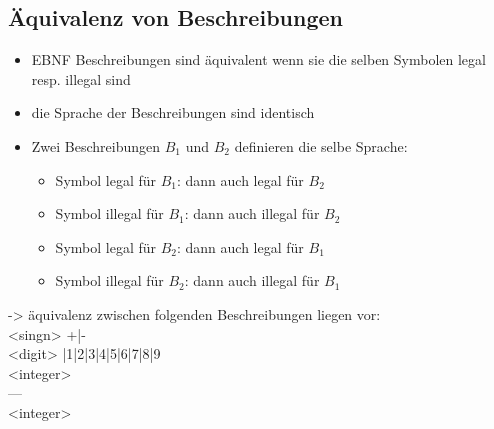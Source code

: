 \documentclass[11pt]{article}
\begin{document}
\subsection{Äquivalenz von Beschreibungen}
\label{sec:org9151ca3}
\begin{itemize}
\item EBNF Beschreibungen sind äquivalent wenn sie die selben Symbolen legal resp. illegal sind\\
\item die Sprache der Beschreibungen sind identisch\\
\item Zwei Beschreibungen \(B_1\) und \(B_2\) definieren die selbe Sprache:\\
\begin{itemize}
\item Symbol legal für \(B_1\): dann auch legal für \(B_2\)\\
\item Symbol illegal für \(B_1\): dann auch illegal für \(B_2\) \\
\item Symbol legal für \(B_2\): dann auch legal für \(B_1\)\\
\item Symbol illegal für \(B_2\): dann auch illegal für \(B_1\)\\
\end{itemize}
\end{itemize}

-> äquivalenz zwischen folgenden Beschreibungen liegen vor:\\
<singn> \Leftarrow +|-\\
<digit> |1|2|3|4|5|6|7|8|9\\
<integer> \\
---\\
<integer> \\
\end{document}
